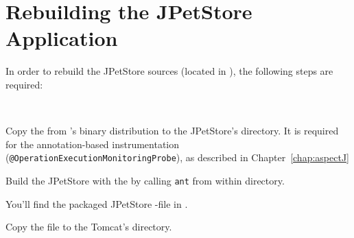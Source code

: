 \begin{figure}[h]\centering
\hfill
{}
\hfill
{}
\hfill
\caption{}
\end{figure}

\newpage

\section{Rebuilding the JPetStore Application}\label{sec:Appendix:JPetStoreExample:rebuild}

\noindent In order to rebuild the JPetStore sources (located in ), 
the following steps are required:

\

\begin{compactenum}
\item Copy the \file{\mainJar{}} from \Kieker{}'s
   binary distribution to the JPetStore's  directory. %
   It is required for the annotation-based instrumentation %
   (\texttt{@Ope\-rationExecutionMonitoringProbe}), as described in Chapter~\ref{chap:aspectJ}
\item Build the JPetStore with the  by calling \texttt{ant} from %
    within  directory. 
\item You'll find the packaged JPetStore -file in .
\item Copy the file to the Tomcat's  directory.
\end{compactenum}

